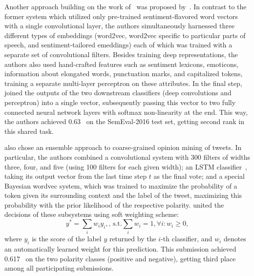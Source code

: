 
Another approach building on the work of~\citet{Severyn:15} was
proposed by~\citet{Rouvier:16}.  In contrast to the former system
which utilized only pre-trained sentiment-flavored word vectors with a
single convolutional layer, the authors simultaneously harnessed three
different types of embeddings (word2vec, word2vec specific to
particular parts of speech, and sentiment-tailored emeddings) each of
which was trained with a separate set of convolutional filters.
Besides training deep representations, the authors also used
hand-crafted features such as sentiment lexicons, emoticons,
information about elongated words, punctuation marks, and capitalized
tokens, training a separate multi-layer perceptron on these
attributes.  In the final step, \citeauthor{Rouvier:16} joined the
outputs of the two downstream classifiers (deep convolutions and
perceptron) into a single vector, subsequently passing this vector to
two fully connected neural network layers with softmax non-linearity
at the end.  This way, the authors achieved 0.63~\F{} on the
SemEval-2016 test set, getting second rank in this shared task.


\citet{Xu:16} also chose an ensemble approach to coarse-grained
opinion mining of tweets.  In particular, the authors combined a
convolutional system with 300 filters of widths three, four, and five
(using 100 filters for each given width); an LSTM
classifier~\cite{Hochreiter:97}, taking its output vector from the
last time step $t$ as the final vote; and a special Bayesian wordvec
system, which was trained to maximize the probability of a token given
its surrounding context and the label of the tweet, maximizing this
probability with the prior likelihood of the respective polarity.
\citeauthor{Xu:16} united the decisions of these subsystems using soft
weighting scheme:
\begin{equation*}
  y^* = \sum_i w_i y_i,\textrm{, s.t.} \sum_i w_i = 1, \forall i: w_i \geq 0,
\end{equation*}
where $y_i$ is the score of the label $y$ returned by the $i$-th
classifier, and $w_i$ denotes an automatically learned weight for this
prediction.  This submission achieved 0.617~\F{} on the two polarity
classes (positive and negative), getting third place among all
participating submissions.



